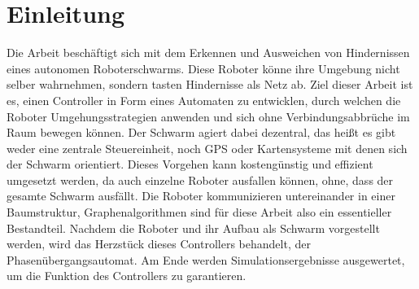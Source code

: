 \section{Einleitung}

Die Arbeit beschäftigt sich mit dem Erkennen und Ausweichen von Hindernissen eines autonomen 
Roboterschwarms. Diese Roboter könne ihre Umgebung nicht selber wahrnehmen, sondern tasten Hindernisse als
Netz ab. Ziel dieser Arbeit ist es, einen Controller in Form eines Automaten zu entwicklen, durch welchen
die Roboter Umgehungsstrategien anwenden und sich ohne Verbindungsabbrüche im Raum bewegen können. Der
Schwarm agiert dabei dezentral, das heißt es gibt weder eine zentrale Steuereinheit, noch GPS oder 
Kartensysteme mit denen sich der Schwarm orientiert. Dieses Vorgehen kann kostengünstig und effizient
umgesetzt werden, da auch einzelne Roboter ausfallen können, ohne, dass der gesamte Schwarm ausfällt. Die
Roboter kommunizieren untereinander in einer Baumstruktur, Graphenalgorithmen sind für diese Arbeit also
ein essentieller Bestandteil. Nachdem die Roboter und ihr Aufbau als Schwarm vorgestellt werden, wird das
Herzstück dieses Controllers behandelt, der Phasenübergangsautomat. Am Ende werden Simulationsergebnisse
ausgewertet, um die Funktion des Controllers zu garantieren.